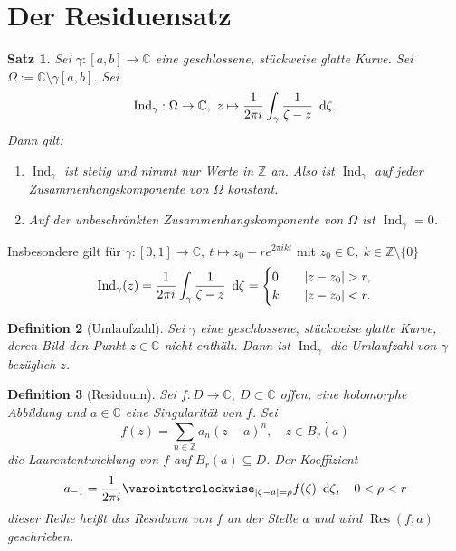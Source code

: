 \documentclass[a4paper,12pt]{book}
\theoremstyle{newthm}
\newtheorem{thm}{Satz}[section]
\theoremstyle{newdef}
\newtheorem{defn}[thm]{Definition}
\theoremstyle{newrem}
\newcommand{\Z}{\mathbb{Z}}
\newcommand{\C}{\mathbb{C}}
\renewcommand{\d}{\ \operatorname{d}\hspace{-2px}}
\newcommand{\Ind}[1]{\operatorname{Ind}_{#1}}
\newcommand{\Res}[2]{\operatorname{Res} \left( #1;#2 \right) }
\begin{document}
	
	\section{Der Residuensatz}
		
		\begin{thm}
			Sei $\gamma: [a,b] \to \C$ eine geschlossene, stückweise glatte Kurve. Sei $ \Omega := \C \setminus \gamma[a,b] $. Sei 
			$$ \Ind{\gamma}: \Omega \to \C,\ z \mapsto \frac{1}{2\pi i} \int_\gamma \frac{1}{\zeta- z}\d\zeta. $$
			Dann gilt:
			\begin{enumerate}[label={\alph*})]
				\item $\Ind{\gamma}$ ist stetig und nimmt nur Werte in $\Z$ an. Also ist $\Ind{\gamma}$ auf jeder Zusammenhangskomponente von $\Omega$ konstant.
				\item Auf der unbeschränkten Zusammenhangskomponente von $\Omega$ ist $\Ind{\gamma} = 0$.
			\end{enumerate}
		\end{thm}
		
		Insbesondere gilt für $ \gamma:[0,1] \to \C,\ t \mapsto z_0 + re^{2\pi ikt} $ mit $ z_0 \in \C,\ k \in \Z\setminus\{0\} $
		\[ \Ind{\gamma}(z) = \frac{1}{2\pi i} \int_\gamma \frac{1}{\zeta- z}\d\zeta = \begin{cases}
		0 \quad &|z-z_0| > r,\\
		k \quad &|z-z_0| < r.
		\end{cases} \]
			
		\begin{defn}[Umlaufzahl]
			Sei $\gamma$ eine geschlossene, stückweise glatte Kurve, deren Bild den Punkt $z \in \C$ nicht enthält. Dann ist $\Ind{\gamma}$ die \emph{Umlaufzahl} von $\gamma$ bezüglich $z$.
		\end{defn}
		
		\begin{defn}[Residuum]
			Sei $ f: D \to \C,\ D \subset \C $ offen, eine holomorphe Abbildung und $a \in \C$ eine Singularität von $f$. Sei 
			\[ f(z) = \sum_{n \in \Z} a_n(z-a)^n,\quad z \in \dot{B_r(a)} \]
			die Laurententwicklung von $f$ auf $ \dot{B_r(a)} \subseteq D $. Der Koeffizient
			\[ a_{-1} = \frac{1}{2\pi i} \varointctrclockwise_{|\zeta - a| = \rho} f(\zeta)\d\zeta, \quad 0 < \rho < r \]
			dieser Reihe heißt das \emph{Residuum} von $f$ an der Stelle $a$ und wird $\Res{f}{a}$ geschrieben.
		\end{defn}
		
\end{document}
